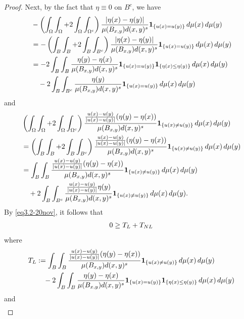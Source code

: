 \documentclass[10pt,a4paper]{amsart}
\begin{document}
\begin{proof}
		
		
		
		Next, by the fact that $\eta\equiv 0$ on $B^c$, we have
		{
			\begin{align*}
				&- \left( \int_\Omega\int_\Omega +2\int_\Omega\int_{\Omega^c} \right) \frac{ |\eta(x)-\eta(y)| }{\mu(B_{x,y}) d(x,y)^s} {\bf 1}_{\{u(x)=u(y)\}}\,d\mu(x)\,d\mu(y)\\
				&=-  \left( \int_B\int_{B} +2\int_{B}\int_{B^c} \right) \frac{ |\eta(x)-\eta(y)| }{\mu(B_{x,y}) d(x,y)^s} {\bf 1}_{\{u(x)=u(y)\}}\,d\mu(x)\,d\mu(y)\\
				&= -2\int_B\int_{B}  \frac{ \eta(y)-\eta(x) }{\mu(B_{x,y}) d(x,y)^s} {\bf 1}_{\{u(x)=u(y)\}}{\bf 1}_{\{ \eta(x)\leq \eta(y)\}}\,d\mu(x)\,d\mu(y)\notag \\
				&\quad   -2\int_{B} \int_{B^c} \frac{ \eta(y) }{\mu(B_{x,y}) d(x,y)^s} {\bf 1}_{\{u(x)=u(y)\}}\,d\mu(x)\,d\mu(y)
			\end{align*}
			and
			\begin{align*}
				&\left( \int_\Omega\int_\Omega+2\int_{\Omega}\int_{\Omega^c}\right) \frac{\frac{u(x)-u(y)}{|u(x)-u(y)|} (\eta(y)-\eta(x)) }{\mu(B_{x,y}) d(x,y)^s} {\bf 1}_{\{ u(x)\neq u(y)\}}\,d\mu(x)\,d\mu(y)\notag \\
				&= \left( \int_B\int_B+2\int_{B}\int_{B^c}\right) \frac{\frac{u(x)-u(y)}{|u(x)-u(y)|} (\eta(y)-\eta(x)) }{\mu(B_{x,y}) d(x,y)^s} {\bf 1}_{\{ u(x)\neq u(y)\}}\,d\mu(x)\,d\mu(y)\notag \\
				&= \int_B\int_B\frac{\frac{u(x)-u(y)}{|u(x)-u(y)|} (\eta(y)-\eta(x)) }{\mu(B_{x,y}) d(x,y)^s} {\bf 1}_{\{ u(x)\neq u(y)\}}\,d\mu(x)\,d\mu(y)  \notag  \\
				&\quad +2\int_{B}\int_{B^c} \frac{\frac{u(x)-u(y)}{|u(x)-u(y)|} \eta(y) }{\mu(B_{x,y}) d(x,y)^s} {\bf 1}_{\{ u(x)\neq u(y)\}}\,d\mu(x)\,d\mu(y).
			\end{align*}
			By \eqref{eq3.2-20nov}, it follows that
			\begin{align}\label{eq1-2oct}
				0\geq T_{\rm L} + T_{\rm NL}
			\end{align}
			where 
			\begin{align*}
				T_{\rm L} &:=  \int_B\int_B\frac{\frac{u(x)-u(y)}{|u(x)-u(y)|} (\eta(y)-\eta(x)) }{\mu(B_{x,y}) d(x,y)^s} {\bf 1}_{\{ u(x)\neq u(y)\}}\,d\mu(x)\,d\mu(y) \\
				& \quad -2\int_B\int_{B}  \frac{ \eta(y)-\eta(x) }{\mu(B_{x,y}) d(x,y)^s} {\bf 1}_{\{u(x)=u(y)\}}{\bf 1}_{\{ \eta(x)\leq \eta(y)\}}\,d\mu(x)\,d\mu(y)
			\end{align*}
			and
			\begin{align*}

\end{align*}}
\end{proof}
\end{document}
